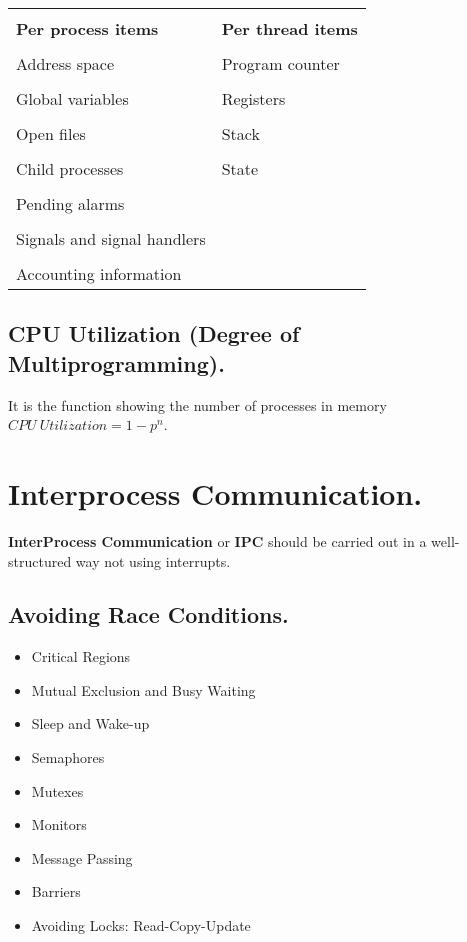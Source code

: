 \documentclass{article}
\begin{document}
\begin{center}
  \begin{tabular}{| m{4.2cm} | m{3cm} |}
    \hline \\[-1em]
    \textbf{Per process items} & \textbf{Per thread items} \\
    \hline \\[-1em]
    Address space & Program counter \\ 
    \hline \\[-1em]
    Global variables & Registers \\ 
    \hline \\[-1em]
    Open files & Stack \\ 
    \hline \\[-1em]
    Child processes & State \\ 
    \hline \\[-1em]
    Pending alarms & \\ 
    \hline \\[-1em]
    Signals and signal handlers & \\ 
    \hline \\[-1em]
    Accounting information &  \\ 
    \hline
  \end{tabular}
\end{center}

\subsection*{CPU Utilization (Degree of Multiprogramming).}
\noindent

It is the function showing the number of processes in memory $CPU\ Utilization = 1 - p^n$.

\section*{Interprocess Communication.}
\noindent

\textbf{InterProcess Communication} or \textbf{IPC} should be carried out in a well-structured way not using interrupts.

\subsection*{Avoiding Race Conditions.}
\noindent

\begin{itemize}
  \item Critical Regions
  \item Mutual Exclusion and Busy Waiting
  \item Sleep and Wake-up 
  \item Semaphores 
  \item Mutexes 
  \item Monitors 
  \item Message Passing
  \item Barriers 
  \item Avoiding Locks: Read-Copy-Update
\end{itemize}
\end{document}
